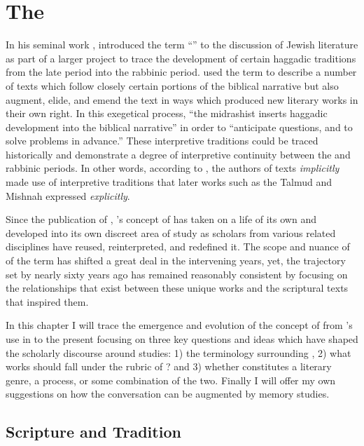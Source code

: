\hypertarget{the-rwb}{%
\chapter{The \RwB}\label{the-rwb}}

In his seminal work , \Vermes
introduced the term ``\rwB'' to the discussion of
\secondtemple Jewish literature as part of a larger project to
trace the development of certain haggadic traditions from the late
\secondtemple period into the rabbinic period.
\vermes used the term \rwB to describe a
number of texts which follow closely certain portions of the biblical
narrative but also augment, elide, and emend the text in ways which
produced new literary works in their own right. In this exegetical
process, ``the midrashist inserts haggadic development into the biblical
narrative'' in order to ``anticipate questions, and to solve problems in
advance.''\autocites[95]{vermes1961}[see also][]{vermes_zsengeller2014}
These interpretive traditions could be traced historically and
demonstrate a degree of interpretive continuity between the
\secondtemple and rabbinic periods. In other words, according to
\vermes, the authors of \rwB texts
\emph{implicitly} made use of interpretive traditions that later works
such as the Talmud and Mishnah expressed \emph{explicitly}.

Since the publication of , \vermes's
concept of \rwB has taken on a life of its own and
developed into its own discreet area of study as scholars from various
related disciplines have reused, reinterpreted, and redefined it. The
scope and nuance of of the term \rwB has shifted a great
deal in the intervening years, yet, the trajectory set by
\vermes nearly sixty years ago has remained reasonably
consistent by focusing on the relationships that exist between these
unique works and the scriptural texts that inspired them.

In this chapter I will trace the emergence and evolution of the concept
of \rwB from \vermes's use in
 to the present focusing on three key questions and
ideas which have shaped the scholarly discourse around
\rwB studies: 1) the terminology surrounding
\rwB, 2) what works should fall under the rubric of
\rwB? and 3) whether \rwB constitutes a
literary genre, a process, or some combination of the two. Finally I
will offer my own suggestions on how the \rwb
conversation can be augmented by memory studies.

\hypertarget{scripture-and-tradition}{%
\section{Scripture and Tradition}\label{scripture-and-tradition}}

